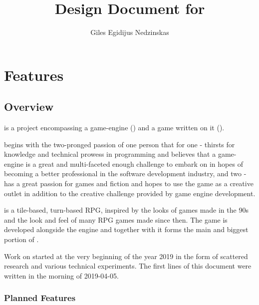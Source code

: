 \documentclass[a4paper,10pt]{book}
\begin{document}
\author{Giles Egidijus Nedzinskas}
\title{Design Document for \Projectname{}}
\maketitle{}

\tableofcontents

\part{Features}

\chapter{Overview}
\Projectname{} is a project encompassing a game-engine (\Enginename{}) and a
game written on it (\Gamename{}).

\Projectname{} begins with the two-pronged passion of one person that for one -
thirsts for knowledge and technical prowess in programming and believes that a
game-engine is a great and multi-faceted enough challenge to embark on in hopes
of becoming a better professional in the software development industry, and two
- has a great passion for games and fiction and hopes to use the game as a
creative outlet in addition to the creative challenge provided by game engine
development.

\Gamename{} is a tile-based, turn-based RPG, inspired by the looks of games
made in the 90s and the look and feel of many RPG games made since then. The
game is developed alongside the engine \Enginename{} and together with it forms
the main and biggest portion of \Projectname{}.

Work on \Projectname{} started at the very beginning of the year 2019 in the
form of scattered research and various technical experiments. The first lines of
this document were written in the morning of 2019-04-05.

\section{Planned Features}
\end{document}
